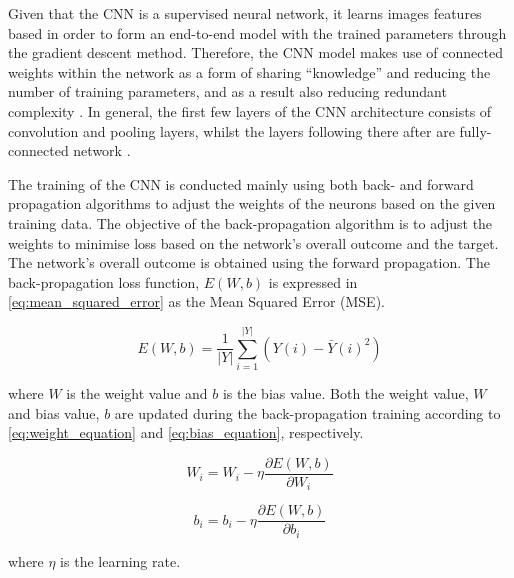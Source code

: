 \documentclass[preprint,12pt]{elsarticle}
\begin{document}
Given that the CNN is a supervised neural network, it learns images features
based in order to form an end-to-end model with the trained parameters
through the gradient descent method. Therefore, the CNN model makes use
of connected weights within the network as a form of sharing “knowledge”
and reducing the number of training parameters, and as a result also reducing
redundant complexity \cite{zhiqiang2017review, chumerin2017convolutional}.
In general, the first few layers of the CNN architecture
consists of convolution and pooling layers, whilst the layers following
there after are fully-connected network \cite{wu2019faultseg3d, lecun1998gradient}.

The training of the CNN is conducted mainly using both back- and forward
propagation algorithms to adjust the weights of the neurons based on
the given training data. The objective of the back-propagation algorithm is
to adjust the weights to minimise loss based on the network’s overall outcome
and the target. The network’s overall outcome is obtained using the forward
propagation. The back-propagation loss function, $E(W,b)$ is expressed in
\ref{eq:mean_squared_error} as the Mean Squared Error (MSE).

\begin{equation}
    \label{eq:mean_squared_error}
    E(W, b) = \frac{1}{|Y|} \sum_{i=1}^{|Y|} (Y(i) - \bar{Y}(i)^{2})
\end{equation}

where $W$ is the weight value and $b$ is the bias value. Both the weight value,
$W$ and bias value, $b$ are updated during the back-propagation training according to
\ref{eq:weight_equation} and \ref{eq:bias_equation}, respectively.

\begin{equation}
    \label{eq:weight_equation}
    W_i = W_i - \eta \frac{\partial E(W,b)}{\partial W_i}
\end{equation}

\begin{equation}
    \label{eq:bias_equation}
    b_i = b_i - \eta\frac{\partial E(W,b)}{\partial b_i}
\end{equation}

where $\eta$ is the learning rate.
\end{document}
